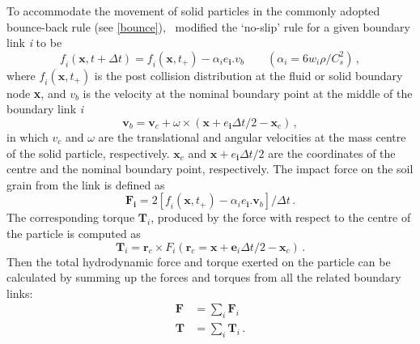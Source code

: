 To accommodate the movement of solid particles in the commonly adopted 
bounce-back rule (see \cref{bounce}),~\citet{Ladd1994} modified the `no-slip' 
rule for a given boundary link \textit{i} to be
%
\begin{equation}
\mathit{f_i}(\mathbf{x}, t + \Delta t)=\mathit{f_i}(\mathbf{x}, t_{+}) - 
\alpha_{\mathit{i}}\mathbf{\mathit{e}_i}.\mathbf{\mathit{v}}_{b} \qquad 
(\alpha_{i}=6\mathit{w_i}\rho/\mathit{C}_{\mathit{s}}^{2})\,,
\end{equation}
%
\noindent where $\mathit{f_i}(\mathbf{x}, t_{+})$ is the post collision 
distribution at the fluid or solid boundary node \textbf{x}, and 
$\mathit{v}_{b}$ is the velocity at the nominal boundary point at the middle of 
the boundary link \textit{i}
%
\begin{equation}
\mathbf{v}_{b}=\mathbf{v}_{c}+\omega \times 
(\mathbf{x}+\mathbf{\mathit{e}_i}\Delta t /2 - \mathbf{x}_{c})\,,
\end{equation}
%
\noindent in which $\mathbf{\mathit{v}}_{c}$ and $\omega$ are the translational 
and angular velocities at the mass centre of the solid particle, respectively. 
$\mathbf{x}_{c}$ and $\mathbf{x}+\mathbf{\mathit{e}_i}\Delta t /2$ are the 
coordinates of the centre and the nominal boundary point,  respectively. The 
impact force on the soil grain from the link is defined as
%
\begin{equation}
\mathbf{F_i}=2[\mathit{f_i} (\mathbf{x}, t_{+}) 
-\alpha_{\mathit{i}}\mathbf{\mathit{e}_i}.\mathbf{v}_{b}]/ \Delta t \,.
\end{equation} 
%
The corresponding torque $\mathbf{T}_{\mathit{i}}$, produced by the force with 
respect to the centre of the particle is computed as
%
\begin{equation}
\mathbf{T}_{\mathit{i}}=\mathbf{r}_{c} \times \mathit{F_i} 
(\mathbf{r}_{c}=\mathbf{x}+\mathbf{e}_{\mathit{i}} \Delta t /2 - \mathbf{x}_{c})
\,.
\end{equation}
%
Then the total hydrodynamic force and torque exerted on the particle can be 
calculated by summing up the forces and torques from all the related boundary 
links:
%
\begin{equation}
\begin{aligned}
\mathbf{F} &= \sum\limits_{\mathit{i}}{\mathbf{F}_{\mathit{i}}} \\
\mathbf{T} &= \sum\limits_{\mathit{i}}{\mathbf{T}_{\mathit{i}}} \,.
\end{aligned}
\end{equation}

